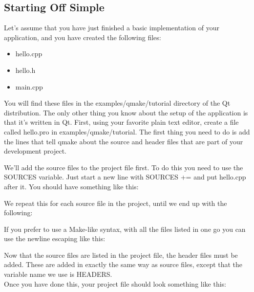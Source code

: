 \subsection{Starting Off Simple}
Let's assume that you have just finished a basic implementation of your application, and you have created the following files:
\begin{itemize}
\item{hello.cpp}
\item{hello.h}
\item{main.cpp}
\end{itemize}
You will find these files in the examples/qmake/tutorial directory of the Qt distribution. The only other thing you know about the setup of the application is that it's written in Qt. First, using your favorite plain text editor, create a file called hello.pro in examples/qmake/tutorial. The first
thing you need to do is add the lines that tell qmake about the source and header files that are part of your development project.
\par
We'll add the source files to the project file first. To do this you need to use the SOURCES variable. Just start a new line with SOURCES += and put hello.cpp after it. You should have something like this:
\begin{center}
  {\color{seagreen}{SOURCES += hello.cpp}}
\end{center}
We repeat this for each source file in the project, until we end up with the following:
\begin{center}
  {\color{seagreen}{SOURCES += hello.cpp\\
      SOURCES += main.cpp}}
\end{center}
If you prefer to use a Make-like syntax, with all the files listed in one go you can use the newline escaping like this:
\begin{center}
  {}
\end{center}
Now that the source files are listed in the project file, the header files must be added. These are added in exactly the same way as source files, except that the variable name we use is HEADERS.\\
Once you have done this, your project file should look something like this:
\begin{center}
{}
\end{center}
